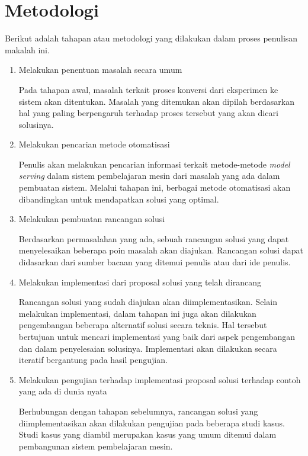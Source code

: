 \section{Metodologi}

Berikut adalah tahapan atau metodologi yang dilakukan dalam proses penulisan makalah ini.

\begin{enumerate}
  \item Melakukan penentuan masalah secara umum
  
  Pada tahapan awal, masalah terkait proses konversi dari eksperimen ke sistem akan ditentukan.
  Masalah yang ditemukan akan dipilah berdasarkan hal yang paling berpengaruh terhadap proses tersebut yang akan dicari solusinya.

  \item Melakukan pencarian metode otomatisasi 
  
  Penulis akan melakukan pencarian informasi terkait metode-metode \textit{model serving} dalam sistem pembelajaran mesin dari masalah yang ada dalam pembuatan sistem.
  Melalui tahapan ini, berbagai metode otomatisasi akan dibandingkan untuk mendapatkan solusi yang optimal.

  \item Melakukan pembuatan rancangan solusi
  
  Berdasarkan permasalahan yang ada, sebuah rancangan solusi yang dapat menyelesaikan beberapa poin masalah akan diajukan.
  Rancangan solusi dapat didasarkan dari sumber bacaan yang ditemui penulis atau dari ide penulis.

  \item Melakukan implementasi dari proposal solusi yang telah dirancang
  
  Rancangan solusi yang sudah diajukan akan diimplementasikan.
  Selain melakukan implementasi, dalam tahapan ini juga akan dilakukan pengembangan beberapa alternatif solusi secara teknis.
  Hal tersebut bertujuan untuk mencari implementasi yang baik dari aspek pengembangan dan dalam penyelesaian solusinya.
  Implementasi akan dilakukan secara iteratif bergantung pada hasil pengujian.

  \item Melakukan pengujian terhadap implementasi proposal solusi terhadap contoh yang ada di dunia nyata
  
  Berhubungan dengan tahapan sebelumnya, rancangan solusi yang diimplementasikan akan dilakukan pengujian pada beberapa studi kasus.
  Studi kasus yang diambil merupakan kasus yang umum ditemui dalam pembangunan sistem pembelajaran mesin.
  
\end{enumerate}